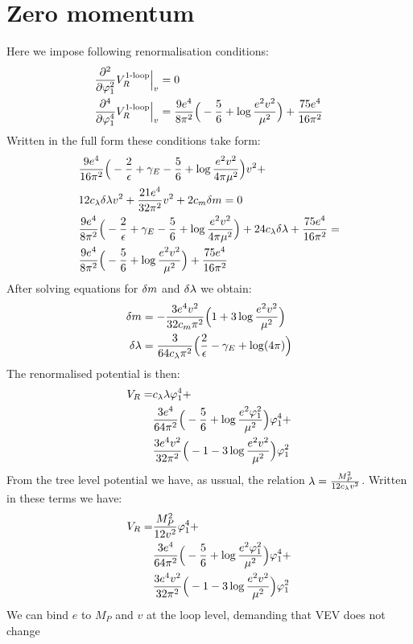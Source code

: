 \section{Zero momentum}
Here we impose following renormalisation conditions:
\begin{align}
\frac{\partial^2 }{\partial \varphi_1^2}V_R^{\textrm{1-loop}}\Big|_{v} &= 0 \\
\frac{\partial^4 }{\partial \varphi_1^4}V_R^{\textrm{1-loop}}\Big|_{v} &= \frac{9e^4}{8\pi^2}\Big(-\frac{5}{6}+\log\frac{e^2
v^2}{\mu^2}\Big)
+\frac{75e^4}{16\pi^2}
\end{align}
Written in the full form these conditions take form:
\begin{align}
&\frac{9e^4}{16\pi^2}\Big(-\frac{2}{\epsilon}+\gamma_E-\frac{5}{6}+\log\frac{e^2
v^2}{4\pi\mu^2}\Big)v^2+ \notag\\
& 12c_\lambda\delta\lambda v^2+\frac{21e^4}{32\pi^2}v^2+2c_m\delta m = 0 \\
&\frac{9e^4}{8\pi^2}\Big(-\frac{2}{\epsilon}+\gamma_E-\frac{5}{6}+\log\frac{e^2v^2}{4\pi\mu^2}\Big)+
24c_\lambda\delta\lambda+\frac{75e^4}{16\pi^2} = \notag \\
&\frac{9e^4}{8\pi^2}\Big(-\frac{5}{6}+\log\frac{e^2v^2}{\mu^2}\Big)+\frac{75e^4}{16\pi^2}
\end{align}
After solving equations for $\delta m$ and $\delta\lambda$ we obtain:
\begin{align}
\delta m &= -\frac{3e^4v^2}{32c_m\pi^2}\Big(1+3
\log\frac{e^2v^2}{\mu^2}\Big) \\
\delta\lambda &= \frac{3}{64c_\lambda\pi^2}\Big(\frac{2}{\epsilon}-\gamma_E+\log(4\pi)\Big)
\end{align}
The renormalised potential is then:
\begin{align}
V_R = &c_\lambda\lambda\varphi_1^4 + \notag \\ 
&\frac{3e^4}{64\pi^2}\Big(-\frac{5}{6}+\log\frac{e^2\varphi_1^2}{\mu^2}\Big)\varphi_1^4+ \notag\\
&\frac{3e^4v^2}{32\pi^2}\Big(-1-3\log\frac{e^2v^2}{\mu^2}\Big)\varphi_1^2
\end{align}
From the tree level potential we have, as ussual, the relation $\lambda = \frac{M_P^2}{12c_\lambda v^2}$. 
Written in these terms we have:
\begin{align}
V_R = &\frac{M_P^2}{12v^2}\varphi_1^4 + \notag \\ 
&\frac{3e^4}{64\pi^2}\Big(-\frac{5}{6}+\log\frac{e^2\varphi_1^2}{\mu^2}\Big)\varphi_1^4+ \notag\\
&\frac{3e^4v^2}{32\pi^2}\Big(-1-3\log\frac{e^2v^2}{\mu^2}\Big)\varphi_1^2
\end{align}
We can bind $e$ to $M_P$ and $v$ at the loop level, demanding that VEV does not change 
